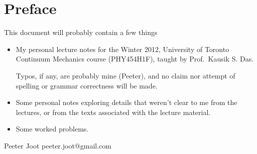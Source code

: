 \chapter*{Preface}\normalsize

This document will probably contain a few things

\begin{itemize}
\item My personal lecture notes for the Winter 2012, University of Toronto Continuum Mechanics course (PHY454H1F), taught by Prof.\ Kausik S. Das.

Typos, if any, are probably mine (Peeter), and no claim nor attempt of spelling or grammar correctness will be made.



\item Some personal notes exploring details that weren't clear to me from the lectures, or from the texts associated with the lecture material.

\item Some worked problems.

\end{itemize}

Peeter Joot  \quad peeter.joot@gmail.com 

